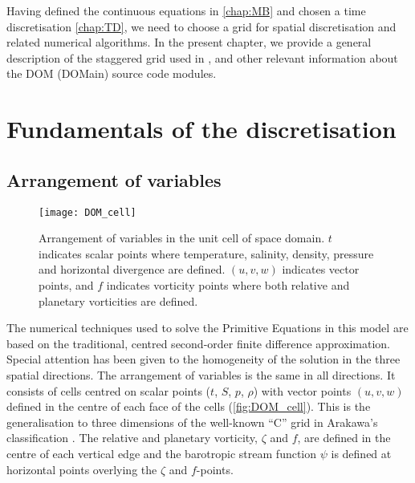\documentclass[../main/NEMO_manual]{subfiles}
\begin{document}
\clearpage

Having defined the continuous equations in \autoref{chap:MB} and
chosen a time discretisation \autoref{chap:TD},
we need to choose a grid for spatial discretisation and related numerical algorithms.
In the present chapter, we provide a general description of the staggered grid used in \NEMO,
and other relevant information about the DOM (DOMain) source code modules.

\section{Fundamentals of the discretisation}
\label{sec:DOM_basics}

\subsection{Arrangement of variables}
\label{subsec:DOM_cell}

\begin{figure}
  \centering
  \texttt{[image: DOM\_cell]}
  \caption[Arrangement of variables in the unit cell of space domain]{
    Arrangement of variables in the unit cell of space domain.
    $t$ indicates scalar points where
    temperature, salinity, density, pressure and horizontal divergence are defined.
    $(u,v,w)$ indicates vector points, and $f$ indicates vorticity points where
    both relative and planetary vorticities are defined.}
  \label{fig:DOM_cell}
\end{figure}

The numerical techniques used to solve the Primitive Equations in this model are based on
the traditional, centred second-order finite difference approximation.
Special attention has been given to the homogeneity of the solution in the three spatial directions.
The arrangement of variables is the same in all directions.
It consists of cells centred on scalar points ($t$, $S$, $p$, $\rho$) with
vector points $(u, v, w)$ defined in the centre of each face of the cells (\autoref{fig:DOM_cell}).
This is the generalisation to three dimensions of the well-known ``C'' grid in
Arakawa's classification \citep{mesinger.arakawa_bk76}.
The relative and planetary vorticity, $\zeta$ and $f$, are defined in the centre of each
vertical edge and the barotropic stream function $\psi$ is defined at horizontal points overlying
the $\zeta$ and $f$-points.
\end{document}
